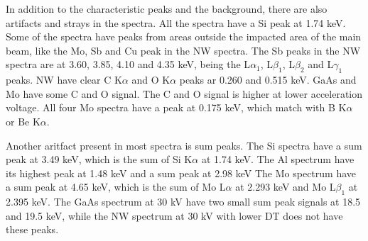 



In addition to the characteristic peaks and the background, there are also artifacts and strays in the spectra. %
All the spectra have a Si peak at 1.74 keV. %
Some of the spectra have peaks from areas outside the impacted area of the main beam, like the Mo, Sb and Cu peak in the NW spectra. %
The Sb peaks in the NW spectra are at 3.60, 3.85, 4.10 and 4.35 keV, being the L$\alpha_1$, L$\beta_1$, L$\beta_2$ and L$\gamma_1$ peaks.
NW have clear C K$\alpha$ and O K$\alpha$ peaks ar 0.260 and 0.515 keV.
GaAs and Mo have some C and O signal.
The C and O signal is higher at lower acceleration voltage.
All four Mo spectra have a peak at 0.175 keV, which match with B K$\alpha$ or Be K$\alpha$.

Another aritfact present in most spectra is sum peaks.
The Si spectra have a sum peak at 3.49 keV, which is the sum of Si K$\alpha$ at 1.74 keV. %
The Al spectrum have its highest peak at 1.48 keV and a sum peak at 2.98 keV
The Mo spectrum have a sum peak at 4.65 keV, which is the sum of Mo L$\alpha$ at 2.293 keV and Mo L$\beta_1$ at 2.395 keV. %
The GaAs spectrum at 30 kV have two small sum peak signals at 18.5 and 19.5 keV, while the NW spectrum at 30 kV with lower DT does not have these peaks. %

